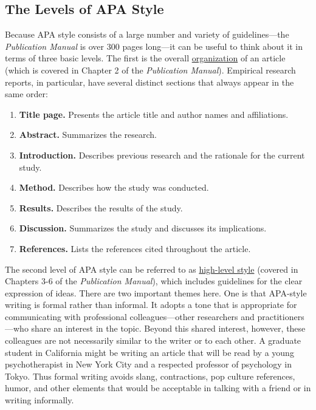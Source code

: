 \documentclass[
]{krantz}
\providecommand{\tightlist}{%
  \setlength{\itemsep}{0pt}\setlength{\parskip}{0pt}}
\begin{document}
\subsection*{The Levels of APA Style}\label{the-levels-of-apa-style}


Because APA style consists of a large number and variety of guidelines---the \emph{Publication Manual} is over 300 pages long---it can be useful to think about it in terms of three basic levels. The first is the overall \hyperref[organization]{organization} of an article (which is covered in Chapter 2 of the \emph{Publication Manual}). Empirical research reports, in particular, have several distinct sections that always appear in the same order:

\begin{enumerate}
\def\labelenumi{\arabic{enumi}.}
\tightlist
\item
  \textbf{Title page.} Presents the article title and author names and affiliations.
\item
  \textbf{Abstract.} Summarizes the research.
\item
  \textbf{Introduction.} Describes previous research and the rationale for the current study.
\item
  \textbf{Method.} Describes how the study was conducted.
\item
  \textbf{Results.} Describes the results of the study.
\item
  \textbf{Discussion.} Summarizes the study and discusses its implications.
\item
  \textbf{References.} Lists the references cited throughout the article.
\end{enumerate}

The second level of APA style can be referred to as \hyperref[high-level-style]{high-level style} (covered in Chapters 3-6 of the \emph{Publication Manual}), which includes guidelines for the clear expression of ideas. There are two important themes here. One is that APA-style writing is formal rather than informal. It adopts a tone that is appropriate for communicating with professional colleagues---other researchers and practitioners---who share an interest in the topic. Beyond this shared interest, however, these colleagues are not necessarily similar to the writer or to each other. A graduate student in California might be writing an article that will be read by a young psychotherapist in New York City and a respected professor of psychology in Tokyo. Thus formal writing avoids slang, contractions, pop culture references, humor, and other elements that would be acceptable in talking with a friend or in writing informally.
\end{document}
